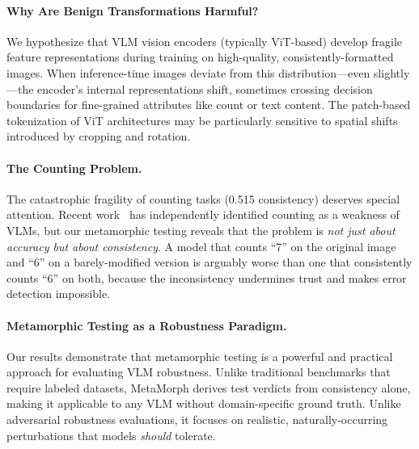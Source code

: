 \documentclass[10pt,twocolumn,letterpaper]{article}
\begin{document}
\paragraph{Why Are Benign Transformations Harmful?}
We hypothesize that VLM vision encoders (typically ViT-based) develop fragile feature representations during training on high-quality, consistently-formatted images. When inference-time images deviate from this distribution---even slightly---the encoder's internal representations shift, sometimes crossing decision boundaries for fine-grained attributes like count or text content. The patch-based tokenization of ViT architectures may be particularly sensitive to spatial shifts introduced by cropping and rotation.

\paragraph{The Counting Problem.}
The catastrophic fragility of counting tasks (0.515 consistency) deserves special attention. Recent work~\cite{tu2024many,rahmanzadehgervi2024vision} has independently identified counting as a weakness of VLMs, but our metamorphic testing reveals that the problem is \emph{not just about accuracy but about consistency}. A model that counts ``7'' on the original image and ``6'' on a barely-modified version is arguably worse than one that consistently counts ``6'' on both, because the inconsistency undermines trust and makes error detection impossible.

\paragraph{Metamorphic Testing as a Robustness Paradigm.}
Our results demonstrate that metamorphic testing is a powerful and practical approach for evaluating VLM robustness. Unlike traditional benchmarks that require labeled datasets, MetaMorph derives test verdicts from consistency alone, making it applicable to any VLM without domain-specific ground truth. Unlike adversarial robustness evaluations, it focuses on realistic, naturally-occurring perturbations that models \emph{should} tolerate.
\end{document}
